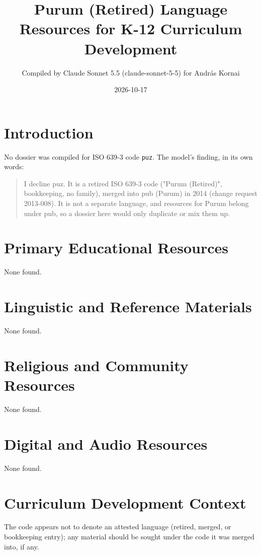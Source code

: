\documentclass[12pt]{article}
\title{Purum (Retired) Language Resources for K-12 Curriculum Development}
\author{Compiled by Claude Sonnet 5.5 (claude-sonnet-5-5) for Andr\'as Kornai}
\date{2026-10-17}
\begin{document}
\maketitle

\section{Introduction}
No dossier was compiled for ISO 639-3 code \texttt{puz}. The model's finding, in its own words:

\begin{quote}
I decline puz. It is a retired ISO 639-3 code ("Purum (Retired)", bookkeeping, no family), merged into pub (Purum) in 2014 (change request 2013-008). It is not a separate language, and resources for Purum belong under pub, so a dossier here would only duplicate or mix them up.
\end{quote}

\section{Primary Educational Resources}
None found.
\section{Linguistic and Reference Materials}
None found.
\section{Religious and Community Resources}
None found.
\section{Digital and Audio Resources}
None found.
\section{Curriculum Development Context}
The code appears not to denote an attested language (retired, merged, or bookkeeping entry); any material should be sought under the code it was merged into, if any.
\end{document}
